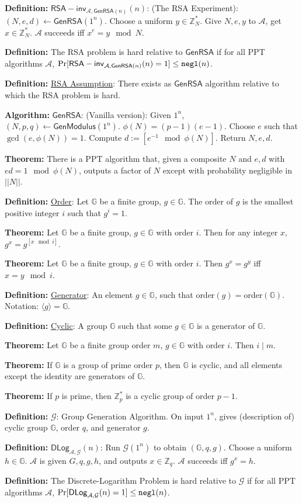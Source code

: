 \documentclass[10pt]{article}
\newcommand{\Z}{\mathbb{Z}}
\newcommand{\G}{\mathbb{G}}
\newcommand{\AAA}{\mathcal{A}}
\newcommand{\GGG}{\mathcal{G}}
\newcommand{\defn}[1]{{\bf Definition:} \underline{#1}}
\newcommand{\thm}[1]{{\bf Theorem:} \underline{#1}}
\newcommand{\alg}[1]{{\bf Algorithm:} \underline{#1}}
\newcommand{\GenM}{\mathsf{GenModulus}}
\newcommand{\GenRSA}{\mathsf{GenRSA}}
\newcommand{\ang}[1]{\langle#1\rangle}
\newcommand{\ExptDLogArgs}[2]{\mathsf{DLog}_{#1,#2}}
\newcommand{\ExptRSAArgs}[2]{\mathsf{RSA-inv}_{#1,#2}}
\newcommand{\ExptDLog}{\ExptDLogArgs{\AAA}{\GGG}}
\newcommand{\ExptRSA}{\ExptRSAArgs{\AAA}{\GenRSA(n)}}
\newcommand{\negl}{{\tt negl}}
\newcommand{\from}{\leftarrow}
\begin{document}
\begin{multicols}{3}
\defn{$\ExptRSA(n)$}: (The RSA Experiment): $(N,e,d)\from\GenRSA(1^n)$. Choose a uniform $y\in\Z^*_N$. Give $N,e,y$ to $\AAA$, get $x\in\Z^*_N$. $\AAA$ succeeds iff $x^e=y\mod{N}$.

\defn{}The RSA problem is hard relative to $\GenRSA$ if for all PPT algorithms $\AAA$, $\Pr[\ExptRSA(n)=1]\leq\negl(n)$.

\defn{RSA Assumption}: There exists as $\GenRSA$ algorithm relative to which the RSA problem is hard.

\alg{$\GenRSA$}: (Vanilla version): Given $1^n$, $(N,p,q)\from\GenM(1^n)$. $\phi(N)=(p-1)(e-1)$. Choose $e$ such that $\gcd(e,\phi(N))=1$. Compute $d:=[e^{-1}\mod{\phi(N)}]$. Return $N,e,d$.

\thm{}There is a PPT algorithm that, given a composite $N$ and $e,d$ with $ed=1\mod{\phi(N)}$, outputs a factor of $N$ except with probability negligible in $||N||$.

\defn{Order}: Let $\G$ be a finite group, $g\in\G$. The order of $g$ is the smallest positive integer $i$ such that $g^i=1$.

\thm{}Let $\G$ be a finite group, $g\in\G$ with order $i$. Then for any integer $x$, $g^x=g^{[x\mod{i}]}$.

\thm{}Let $\G$ be a finite group, $g\in\G$ with order $i$. Then $g^x=g^y$ iff $x=y\mod{i}$.

\defn{Generator}: An element $g\in\G$, such that order$(g)=$order$(\G)$. Notation: $\ang{g}=\G$.

\defn{Cyclic}: A group $\G$ such that some $g\in\G$ is a generator of $\G$.

\thm{}Let $\G$ be a finite group order $m$, $g\in\G$ with order $i$. Then $i\mid m$.

\thm{}If $\G$ is a group of prime order $p$, then $\G$ is cyclic, and all elements except the identity are generators of $\G$.

\thm{}If $p$ is prime, then $\Z_p^*$ is a cyclic group of order $p-1$.

\defn{$\GGG$}: Group Generation Algorithm. On input $1^n$, gives (description of) cyclic group $\G$, order $q$, and generator $g$.

\defn{$\ExptDLog(n)$}: Run $\GGG(1^n)$ to obtain $(\G,q,g)$. Choose a uniform $h\in\G$. $\AAA$ is given $G,q,g,h$, and outputs $x\in\Z_q$. $\AAA$ succeeds iff $g^x=h$.

\defn{}The Discrete-Logarithm Problem is hard relative to $\GGG$ if for all PPT algorithms $\AAA$, $\Pr[\ExptDLog(n)=1]\leq\negl(n)$.


\end{multicols}
\end{document}
